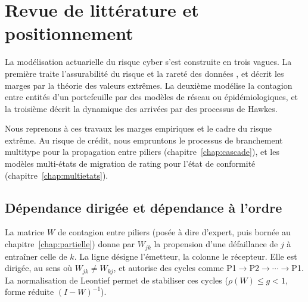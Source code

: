 \chapter{Revue de littérature et positionnement}
\label{ch:positionnement}


La modélisation actuarielle du risque cyber s'est construite en trois vagues. La première traite
l'assurabilité du risque et la rareté des données \citep{BienerElingWirfs2015}, et décrit les
marges par la théorie des valeurs extrêmes. La deuxième modélise la contagion entre entités d'un
portefeuille par des modèles de réseau ou épidémiologiques, et la troisième décrit la dynamique des
arrivées par des processus de Hawkes.

Nous reprenons à ces travaux les marges empiriques et le cadre du risque extrême. Au risque de
crédit, nous empruntons le processus de branchement multitype pour la propagation entre piliers
(chapitre~\ref{chap:cascade}), et les modèles multi-états de migration de rating pour l'état de
conformité (chapitre~\ref{chap:multietats}). 

\section{Dépendance dirigée et dépendance à l'ordre}

La matrice $W$ de contagion entre piliers (posée à dire d'expert, puis bornée au chapitre~\ref{chap:partielle}) donne par $W_{jk}$ la propension d'une défaillance de $j$ à entraîner celle de $k$. La ligne désigne l'émetteur, la colonne le récepteur. Elle est
dirigée, au sens où $W_{jk}\neq W_{kj}$, et autorise des cycles comme P1$\to$P2$\to\cdots\to$P1. La
normalisation de Leontief permet de stabiliser ces cycles ($\rho(W)\le g<1$, forme réduite $(I-W)^{-1}$).

